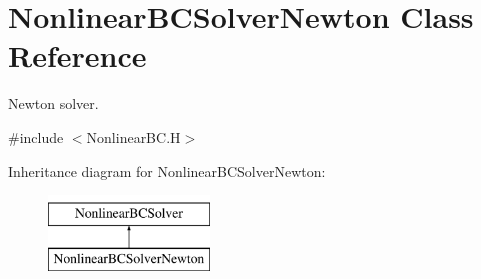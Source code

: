 \hypertarget{class_nonlinear_b_c_solver_newton}{}\section{Nonlinear\+B\+C\+Solver\+Newton Class Reference}
\label{class_nonlinear_b_c_solver_newton}


Newton solver.  




{\ttfamily \#include $<$Nonlinear\+B\+C.\+H$>$}

Inheritance diagram for Nonlinear\+B\+C\+Solver\+Newton\+:\begin{figure}[H]
\begin{center}
\leavevmode
\includegraphics[height=2.000000cm]{class_nonlinear_b_c_solver_newton}
\end{center}
\end{figure}
